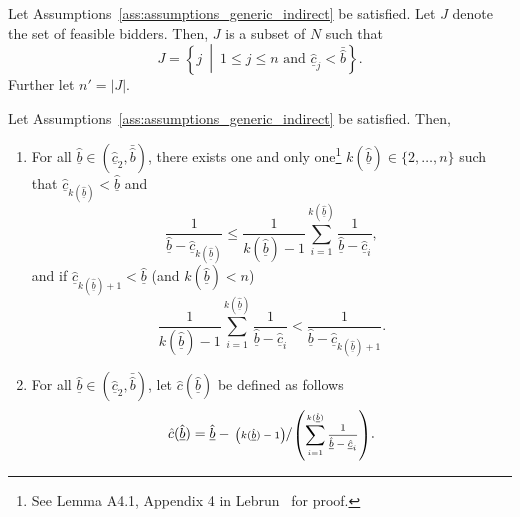 \begin{define}
\label{def:feasible_bidders_indirect}
Let Assumptions~\ref{ass:assumptions_generic_indirect} be satisfied. Let $J$ denote the set of feasible bidders. Then, $J$ is a subset of $N$ such that
\begin{equation*}
  J = \left\{j \:\middle\vert\: 1\leq j\leq n \text{ and } \underline{\hat{c}}_j < \bar{\hat{b}}\right\}.
\end{equation*}
Further let $n' = |J|$.
\end{define}

\begin{define}
\label{def:lower_bound_bids_indirect}
Let Assumptions~\ref{ass:assumptions_generic_indirect} be satisfied. Then,
\begin{enumerate}
  \item For all $\underline{\hat{b}}\in (\underline{\hat{c}}_2, \bar{\hat{b}})$, there exists one and only one\footnote{See Lemma A4.1, Appendix 4 in Lebrun~\cite{Lebrun2004} for proof.} $k(\underline{\hat{b}})\in \{2,\dotsc,n\}$ such that $\underline{\hat{c}}_{k(\underline{\hat{b}})} < \underline{\hat{b}}$ and
  \begin{equation*}
    \frac{1}{\underline{\hat{b}} - \underline{\hat{c}}_{k(\underline{\hat{b}})}}\leq \frac{1}{k(\underline{\hat{b}}) - 1}\sum_{i=1}^{k(\underline{\hat{b}})}\frac{1}{\underline{\hat{b}} - \underline{\hat{c}}_i},
  \end{equation*}
  and if $\underline{\hat{c}}_{k(\underline{\hat{b}})+1} < \underline{\hat{b}}$ (and $k(\underline{\hat{b}}) < n$)
  \begin{equation*}
    \frac{1}{k(\underline{\hat{b}}) - 1}\sum_{i=1}^{k(\underline{\hat{b}})}\frac{1}{\underline{\hat{b}} - \underline{\hat{c}}_i} < \frac{1}{\underline{\hat{b}} - \underline{\hat{c}}_{k(\underline{\hat{b}})+1}}.
  \end{equation*}
  \item For all $\underline{\hat{b}}\in (\underline{\hat{c}}_2, \bar{\hat{b}})$, let $\hat{c}(\underline{\hat{b}})$ be defined as follows
  \begin{equation}
  \label{eq:lower_bound_bids_cost_indirect}
    \hat{c}(\underline{\hat{b}}) = \underline{\hat{b}} - \sfrac{\left(k(\underline{\hat{b}})-1\right)}{\left(\sum_{i=1}^{k(\underline{\hat{b}})} \frac{1}{\underline{\hat{b}} - \underline{\hat{c}}_i}\right)}.
  \end{equation}
\end{enumerate}
\end{define}
